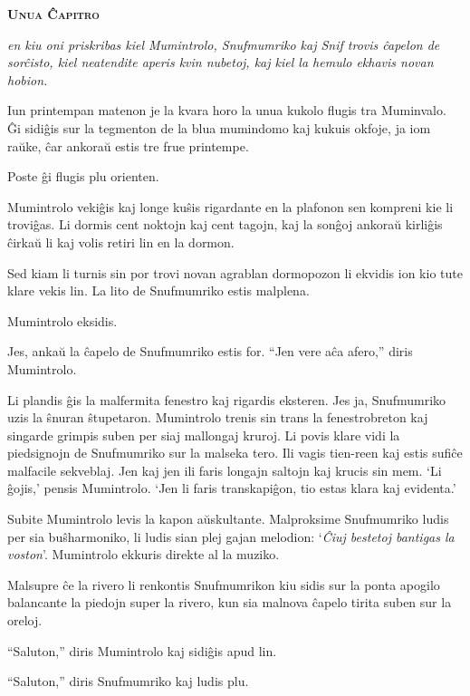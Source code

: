 \begin{center}\textbf{\Large\color{ForestGreen}\textsc{Unua Ĉapitro}}\end{center}

\noindent\textit{en kiu oni priskribas kiel Mumintrolo, Snufmumriko kaj Snif trovis ĉapelon de sorĉisto, kiel neatendite aperis kvin nubetoj, kaj kiel la hemulo ekhavis novan hobion.}
\hfill \break
\hypertarget{Unua Ĉapitro}{}
\label{Unua Ĉapitro}


\noindent Iun printempan matenon je la kvara horo la unua kukolo flugis tra Muminvalo. Ĝi sidiĝis sur la tegmenton de la blua mumindomo kaj kukuis okfoje, ja iom raŭke, ĉar ankoraŭ estis tre frue printempe.

Poste ĝi flugis plu orienten.

Mumintrolo vekiĝis kaj longe kuŝis rigardante en la plafonon sen kompreni kie li troviĝas. Li dormis cent noktojn kaj cent tagojn, kaj la sonĝoj ankoraŭ kirliĝis ĉirkaŭ li kaj volis retiri lin en la dormon.

Sed kiam li turnis sin por trovi novan agrablan dormopozon li ekvidis ion kio tute klare vekis lin. La lito de Snufmumriko estis malplena.

Mumintrolo eksidis.

Jes, ankaŭ la ĉapelo de Snufmumriko estis for. ``Jen vere aĉa afero,'' diris Mumintrolo.

Li plandis ĝis la malfermita fenestro kaj rigardis eksteren. Jes ja, Snufmumriko uzis la ŝnuran ŝtupetaron. Mumintrolo trenis sin trans la fenestrobreton kaj singarde grimpis suben per siaj mallongaj kruroj. Li povis klare vidi la piedsignojn de Snufmumriko sur la malseka tero. Ili vagis tien-reen kaj estis sufiĉe malfacile sekveblaj. Jen kaj jen ili faris longajn saltojn kaj krucis sin mem. `Li ĝojis,' pensis Mumintrolo. `Jen li faris transkapiĝon, tio estas klara kaj evidenta.'

Subite Mumintrolo levis la kapon aŭskultante. Malproksime Snufmumriko ludis per sia buŝharmoniko, li ludis sian plej gajan melodion: `\emph{Ĉiuj bestetoj bantigas la voston}'. Mumintrolo ekkuris direkte al la muziko.

Malsupre ĉe la rivero li renkontis Snufmumrikon kiu sidis sur la ponta apogilo balancante la piedojn super la rivero, kun sia malnova ĉapelo tirita suben sur la oreloj.

``Saluton,'' diris Mumintrolo kaj sidiĝis apud lin.

``Saluton,'' diris Snufmumriko kaj ludis plu.

